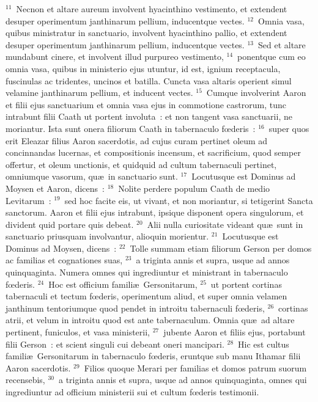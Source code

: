 ${}^{11}$~Necnon et altare aureum involvent hyacinthino vestimento, et extendent desuper operimentum janthinarum pellium, inducentque vectes.
${}^{12}$~Omnia vasa, quibus ministratur in sanctuario, involvent hyacinthino pallio, et extendent desuper operimentum janthinarum pellium, inducentque vectes.
${}^{13}$~Sed et altare mundabunt cinere, et involvent illud purpureo vestimento,
${}^{14}$~ponentque cum eo omnia vasa, quibus in ministerio ejus utuntur, id est, ignium receptacula, fuscinulas ac tridentes, uncinos et batilla. Cuncta vasa altaris operient simul velamine janthinarum pellium, et inducent vectes.
${}^{15}$~Cumque involverint Aaron et filii ejus sanctuarium et omnia vasa ejus in commotione castrorum, tunc intrabunt filii Caath ut portent involuta~: et non tangent vasa sanctuarii, ne moriantur. Ista sunt onera filiorum Caath in tabernaculo fœderis~:
${}^{16}$~super quos erit Eleazar filius Aaron sacerdotis, ad cujus curam pertinet oleum ad concinnandas lucernas, et compositionis incensum, et sacrificium, quod semper offertur, et oleum unctionis, et quidquid ad cultum tabernaculi pertinet, omniumque vasorum, qu\ae\ in sanctuario sunt.
${}^{17}$~Locutusque est Dominus ad Moysen et Aaron, dicens~:
${}^{18}$~Nolite perdere populum Caath de medio Levitarum~:
${}^{19}$~sed hoc facite eis, ut vivant, et non moriantur, si tetigerint Sancta sanctorum. Aaron et filii ejus intrabunt, ipsique disponent opera singulorum, et divident quid portare quis debeat.
${}^{20}$~Alii nulla curiositate videant qu\ae\ sunt in sanctuario priusquam involvantur, alioquin morientur.
${}^{21}$~Locutusque est Dominus ad Moysen, dicens~:
${}^{22}$~Tolle summam etiam filiorum Gerson per domos ac familias et cognationes suas,
${}^{23}$~a triginta annis et supra, usque ad annos quinquaginta. Numera omnes qui ingrediuntur et ministrant in tabernaculo fœderis.
${}^{24}$~Hoc est officium famili\ae\ Gersonitarum,
${}^{25}$~ut portent cortinas tabernaculi et tectum fœderis, operimentum aliud, et super omnia velamen janthinum tentoriumque quod pendet in introitu tabernaculi fœderis,
${}^{26}$~cortinas atrii, et velum in introitu quod est ante tabernaculum. Omnia qu\ae\ ad altare pertinent, funiculos, et vasa ministerii,
${}^{27}$~jubente Aaron et filiis ejus, portabunt filii Gerson~: et scient singuli cui debeant oneri mancipari.
${}^{28}$~Hic est cultus famili\ae\ Gersonitarum in tabernaculo fœderis, eruntque sub manu Ithamar filii Aaron sacerdotis.
${}^{29}$~Filios quoque Merari per familias et domos patrum suorum recensebis,
${}^{30}$~a triginta annis et supra, usque ad annos quinquaginta, omnes qui ingrediuntur ad officium ministerii sui et cultum fœderis testimonii.
